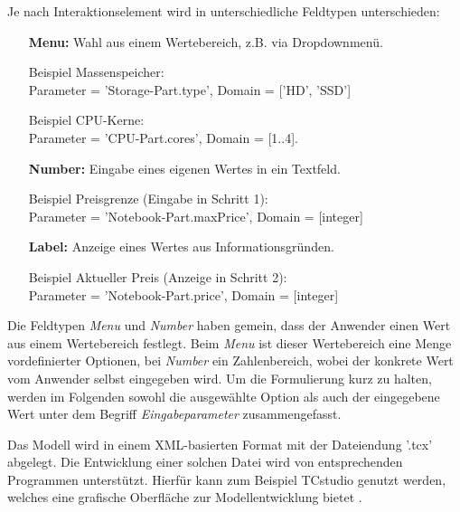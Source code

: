 \documentclass[11pt, a4paper, titlepage, listof=totoc, bibliography=totoc, index=totoc, twoside, openright, headings=normal]{scrreprt}
\begin{document}
\begin{enumerate}[1.]
Je nach Interaktionselement wird in unterschiedliche Feldtypen unterschieden:
\begin{enumerate}[(a)]
\item [\textbf{Menu:}] Wahl aus einem Wertebereich, z.B. via Dropdownmenü.

Beispiel Massenspeicher:\\
Parameter = 'Storage-Part.type',  Domain = ['HD', 'SSD']

Beispiel CPU-Kerne:\\
Parameter = 'CPU-Part.cores', Domain = [1..4].
\item [\textbf{Number:}] Eingabe eines eigenen Wertes in ein Textfeld.

Beispiel Preisgrenze (Eingabe in Schritt 1):\\
 Parameter = 'Notebook-Part.maxPrice', Domain = [integer]
\item [\textbf{Label:}] Anzeige eines Wertes aus Informationsgründen.

Beispiel Aktueller Preis (Anzeige in Schritt 2):\\
Parameter = 'Notebook-Part.price', Domain = [integer]
\end{enumerate}
\end{enumerate}

Die Feldtypen \emph{Menu} und \emph{Number} haben gemein, dass der Anwender einen Wert aus einem Wertebereich festlegt. Beim \emph{Menu} ist dieser Wertebereich eine Menge vordefinierter Optionen, bei \emph{Number} ein Zahlenbereich, wobei der konkrete Wert vom Anwender selbst eingegeben wird. Um die Formulierung kurz zu halten, werden im Folgenden sowohl die ausgewählte Option als auch der eingegebene Wert unter dem Begriff \emph{Eingabeparameter} zusammengefasst.

Das Modell wird in einem XML-basierten Format mit der Dateiendung '.tcx' abgelegt. Die Entwicklung einer solchen Datei wird von entsprechenden Programmen unterstützt. Hierfür kann zum Beispiel \glqq TCstudio\grqq{} genutzt werden, welches eine grafische Oberfläche zur Modellentwicklung bietet \citep{tactonAbout}.
\end{document}
